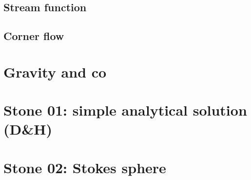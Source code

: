 \documentclass[a4paper]{article}
\begin{document}
\subsection{Stream function} \label{sec:streamfunction} 
\newpage %
\subsection{Corner flow} \label{sec:cornerflow} 



\newpage
\section{Gravity and co}





\newpage %
\section*{
Stone 01: simple analytical solution (D\&H) 
\label{f01}}

\newpage %
\section*{
Stone 02: Stokes sphere 
\label{f02}}

\newpage %
\end{document}
